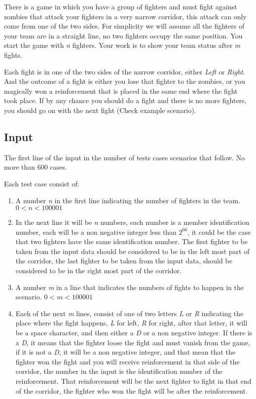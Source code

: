 
There is a game in which you have a group of fighters and must fight against zombies that attack your fighters in a very narrow corridor, this attack can only come from one of the two sides. For simplicity we will assume all the fighters of your team are in a straight line, no two fighters occupy the same position. You start the game with \textit{n} fighters. Your work is to show your team status after \textit{m} fights.

Each fight is in one of the two sides of the narrow corridor, either \textit{Left} or \textit{Right}. And the outcome of a fight is either you lose that fighter to the zombies, or you magically won a reinforcement that is placed in the same end where the fight took place. If by any chance you should do a fight and there is no more fighters, you should go on with the next fight (Check example scenario).


\subsection* {Input}

The first line of the input in the number of tests cases scenarios that follow. No more than 600 cases.

Each test case consist of:

\begin{enumerate}
	\item A number \textit{n} in the first line indicating the number of fighters in the team. $0 < n < 100001$
	\item In the next line it will be \textit{n} numbers, each number is a member identification number, each will be a non negative integer less than $2^{66}$, it could be the case that two fighters have the same identification number. The first fighter to be taken from the input data should be considered to be in the left most part of the corridor, the last fighter to be taken from the input data, should be considered to be in the right most part of the corridor.
	\item A number \textit{m} in a line that indicates the numbers of fights to happen in the scenario. $0 < m < 100001$
	\item Each of the next \textit{m} lines, consist of one of two letters \textit{L} or \textit{R} indicating the place where the fight happens, \textit{L} for left, \textit{R} for right, after that letter, it will be a space character, and then either a \textit{D} or a non negative integer. If there is a \textit{D}, it means  that the fighter loose the fight and must vanish from the game, if it is not a \textit{D}, it will be a non negative integer, and that mean that the fighter won the fight and you will receive reinforcement in that side of the corridor, the number in the input is the identification number of the reinforcement. That reinforcement will be the next fighter to fight in that end of the corridor, the fighter who won the fight will be after the reinforcement. 
\end{enumerate}

